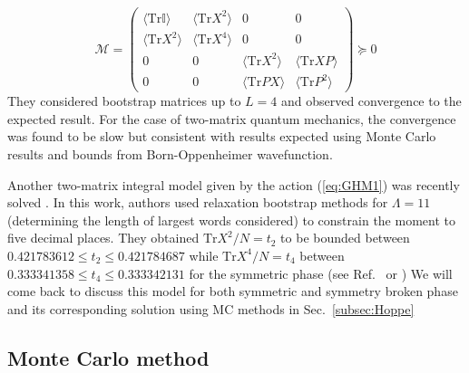 \documentclass[11pt]{article}
\begin{document}
\begin{equation}
	\mathcal{M} = 
	\begin{pmatrix}
		\langle \mbox{Tr}\mathbb{I} \rangle & \langle \mbox{Tr} X^2 \rangle & 0 & 0 \\
		\langle \mbox{Tr} X^2 \rangle & \langle \mbox{Tr} X^4 \rangle  & 0 & 0 \\ 
		0 & 0 & \langle \mbox{Tr} X^2 \rangle & \langle \mbox{Tr} XP \rangle \\
		0 & 0  & \langle \mbox{Tr} PX \rangle & \langle \mbox{Tr} P^2 \rangle
	\end{pmatrix}  \succeq 0
\end{equation}
They considered bootstrap matrices up to $L=4$ and observed
convergence to the expected result. 
For the case of two-matrix quantum mechanics, the convergence
was found to be slow but consistent with results expected using 
Monte Carlo results and bounds from Born-Oppenheimer wavefunction. 

Another two-matrix integral model given by the action 
(\ref{eq:GHM1}) was recently solved \cite{Kazakov:2021lel}. 
In this work, authors used relaxation bootstrap methods for 
$\Lambda=11$ (determining the length of largest words considered)
to constrain the moment to five decimal places. They obtained $\mathrm{Tr}X^2/N = t_2$ 
to be bounded between $ 0.421783612 \le t_2 \le 0.421784687$ while $\mathrm{Tr}X^4/N = t_4$ 
between $0.333341358 \le t_4 \le 0.333342131$ for the symmetric phase (see Ref.~\cite{Kazakov:2021lel} or )
We will come back to discuss this model for both symmetric and symmetry broken
phase and its corresponding solution using MC methods in Sec.~\ref{subsec:Hoppe}



\subsection{Monte Carlo method}
\end{document}
